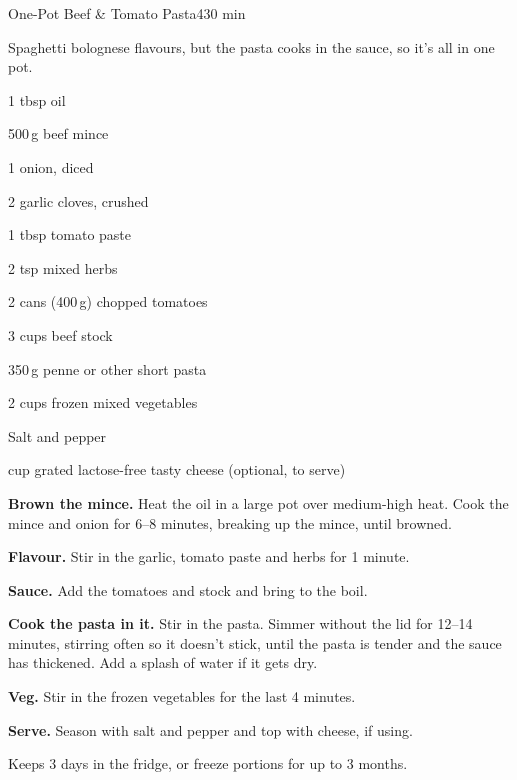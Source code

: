 \begin{recipebox}{One-Pot Beef \& Tomato Pasta}{4}{30 min}

Spaghetti bolognese flavours, but the pasta cooks in the sauce, so it's all in
one pot.

\begin{ingredients}
  \item 1 tbsp oil
  \item 500\,g beef mince
  \item 1 onion, diced
  \item 2 garlic cloves, crushed
  \item 1 tbsp tomato paste
  \item 2 tsp mixed herbs
  \item 2 cans (400\,g) chopped tomatoes
  \item 3 cups beef stock
  \item 350\,g penne or other short pasta
  \item 2 cups frozen mixed vegetables
  \item Salt and pepper
  \item {} cup grated lactose-free tasty cheese (optional, to serve)
\end{ingredients}

\begin{method}
  \item \textbf{Brown the mince.} Heat the oil in a large pot over medium-high heat.
        Cook the mince and onion for 6--8 minutes, breaking up the mince, until
        browned.
  \item \textbf{Flavour.} Stir in the garlic, tomato paste and herbs for 1 minute.
  \item \textbf{Sauce.} Add the tomatoes and stock and bring to the boil.
  \item \textbf{Cook the pasta in it.} Stir in the pasta. Simmer without the lid for
        12--14 minutes, stirring often so it doesn't stick, until the pasta is
        tender and the sauce has thickened. Add a splash of water if it gets dry.
  \item \textbf{Veg.} Stir in the frozen vegetables for the last 4 minutes.
  \item \textbf{Serve.} Season with salt and pepper and top with cheese, if using.
\end{method}

\begin{notelist}
  \item Keeps 3 days in the fridge, or freeze portions for up to 3 months.
\end{notelist}

\end{recipebox}
